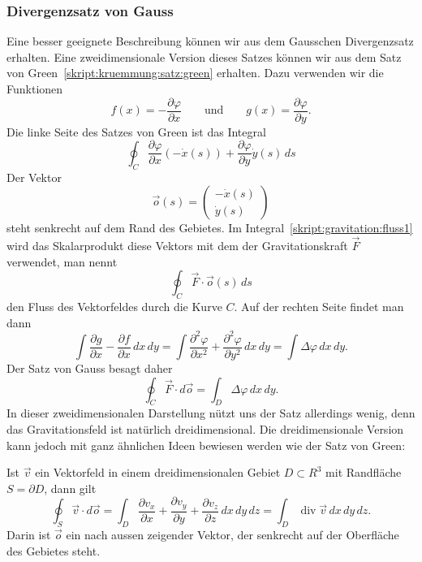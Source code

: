 \subsubsection{Divergenzsatz von Gauss}
Eine besser geeignete Beschreibung können wir aus dem Gausschen
Divergenzsatz erhalten.
Eine zweidimensionale Version dieses Satzes können wir
aus dem Satz von Green~\eqref{skript:kruemmung:satz:green}
erhalten.
Dazu verwenden wir die Funktionen 
\[
f(x)=-\frac{\partial \varphi}{\partial x}
\qquad\text{und}\qquad
g(x)=\frac{\partial \varphi}{\partial y}.
\]
Die linke Seite des Satzes von Green ist das Integral
\begin{equation}
\oint_{C}
\frac{\partial \varphi}{\partial x} (-\dot x(s))
+
\frac{\partial \varphi}{\partial y} \dot y(s)
\,ds
\label{skript:gravitation:fluss1}
\end{equation}
Der Vektor
\[
\vec o(s) = \begin{pmatrix}-\dot x(s)\\\dot y(s)\end{pmatrix}
\]
steht senkrecht auf dem Rand des Gebietes.
Im Integral~\eqref{skript:gravitation:fluss1} wird das Skalarprodukt
diese Vektors mit dem der Gravitationskraft $\vec F$ verwendet,
man nennt
\[
\oint_{C} \vec F\cdot \vec o(s)\,ds
\]
den Fluss des Vektorfeldes durch die Kurve $C$.
Auf der rechten Seite findet man dann 
\[
\int \frac{\partial g}{\partial x}-\frac{\partial f}{\partial x}\,dx\,dy
=
\int
\frac{\partial^2\varphi}{\partial x^2}
+
\frac{\partial^2\varphi}{\partial y^2}
\,dx\,dy
=
\int\Delta\varphi \,dx\,dy.
\]
Der Satz von Gauss besagt daher
\[
\oint_{C} \vec F\cdot d\vec o
=
\int_{D} \Delta\varphi\,dx\,dy.
\]
In dieser zweidimensionalen Darstellung nützt uns der Satz allerdings
wenig, denn das Gravita\-tions\-feld ist natürlich dreidimensional.
Die dreidimensionale Version kann jedoch mit ganz ähnlichen Ideen
bewiesen werden wie der Satz von Green:

\begin{satz}[Gauss] Ist $\vec v$ ein Vektorfeld in
einem dreidimensionalen Gebiet $D\subset R^3$ mit Randfläche $S=\partial D$,
dann gilt
\begin{equation}
\oint_S \vec v\cdot d\vec o
=
\int_D 
\frac{\partial v_x}{\partial x}
+
\frac{\partial v_y}{\partial y}
+
\frac{\partial v_z}{\partial z}
\,dx\,dy\,dz
=
\int_D \operatorname{div}\vec v\,dx\,dy\,dz.
\label{skript:gravitation:gausssatz}
\end{equation}
Darin ist $\vec o$ ein nach aussen zeigender Vektor, der
senkrecht auf der Oberfläche des Gebietes steht.
\end{satz}

